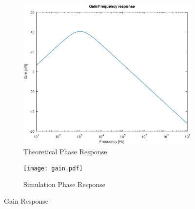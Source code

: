 \begin{figure}[H]
\centering
\begin{subfigure}{.5\textwidth}
    \centering
    \vspace{2.8 cm}
    \includegraphics[scale=0.4]{gain_response.eps}
    \caption{Theoretical Phase Response}
\end{subfigure}%
\begin{subfigure}{.5\textwidth}
    \centering
    \texttt{[image: gain.pdf]}
    \caption{Simulation Phase Response}
\end{subfigure}
\caption{Gain Response}
\label{fig:comp2}
\end{figure}

